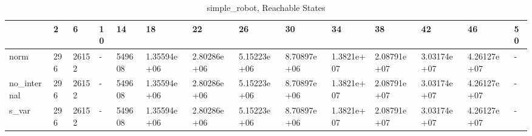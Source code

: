 \begin{table}
\caption{simple_robot, Reachable States}
\label{simple_robot_reach}
\begin{tabular}{llllllllllllll}
\toprule
 & 2 & 6 & 10 & 14 & 18 & 22 & 26 & 30 & 34 & 38 & 42 & 46 & 50 \\
\midrule
norm & 296 & 26152 & - & 549608 & 1.35594e+06 & 2.80286e+06 & 5.15223e+06 & 8.70897e+06 & 1.3821e+07 & 2.08791e+07 & 3.03174e+07 & 4.26127e+07 & - \\
no_internal & 296 & 26152 & - & 549608 & 1.35594e+06 & 2.80286e+06 & 5.15223e+06 & 8.70897e+06 & 1.3821e+07 & 2.08791e+07 & 3.03174e+07 & 4.26127e+07 & - \\
s_var & 296 & 26152 & - & 549608 & 1.35594e+06 & 2.80286e+06 & 5.15223e+06 & 8.70897e+06 & 1.3821e+07 & 2.08791e+07 & 3.03174e+07 & 4.26127e+07 & - \\
\bottomrule
\end{tabular}
\end{table}
